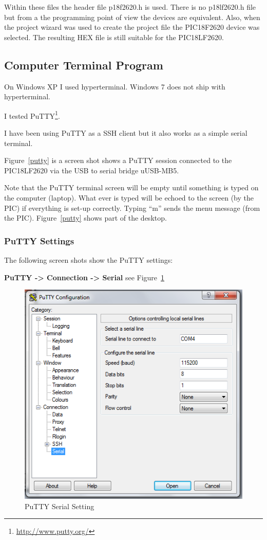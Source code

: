 \documentclass[twocolumn]{article}
\makeatletter
\def\maxwidth{\ifdim\Gin@nat@width>\linewidth\linewidth
\else\Gin@nat@width\fi}
\let\Oldincludegraphics\includegraphics
\renewcommand{\includegraphics}[1]{\Oldincludegraphics[width=\maxwidth]{#1}}
\makeatother
\begin{document}
Within these files the header file p18f2620.h is used. There is no
p18lf2620.h file but from a the programming point of view the devices
are equivalent. Also, when the project wizard was used to create the
project file the PIC18F2620 device was selected. The resulting HEX file
is still suitable for the PIC18LF2620.

\subsection{Computer Terminal Program}

On Windows XP I used hyperterminal. Windows 7 does not ship with
hyperterminal.

I tested PuTTY\footnote{\url{http://www.putty.org/}}.

I have been using PuTTY as a SSH client but it also works as a simple
serial terminal.

Figure~\ref{putty} is a screen shot shows a PuTTY session connected to the PIC18LF2620 via
the USB to serial bridge uUSB-MB5.

Note that the PuTTY terminal screen will be empty until something is
typed on the computer (laptop). What ever is typed will be echoed to the
screen (by the PIC) if everything is set-up correctly. Typing ``m''
sends the menu message (from the PIC). Figure~\ref{putty} shows part of the desktop.

\subsubsection{PuTTY Settings}

The following screen shots show the PuTTY settings:

\textbf{PuTTY -\textgreater{} Connection -\textgreater{} Serial} see Figure~\ref{puttyserial}

\begin{figure}[htbp]
\centering
\includegraphics{phys1600/putty_connection.png}
\caption{PuTTY Serial Setting}
\label{puttyserial}
\end{figure}
\end{document}
